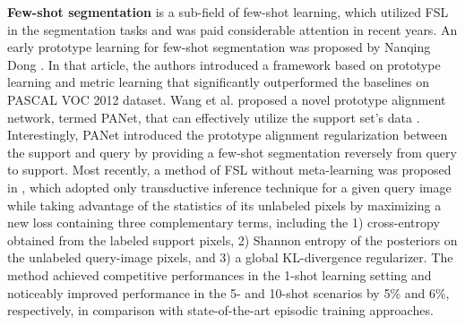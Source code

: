 \documentclass{ieeeaccess}
\begin{document}
{\bf Few-shot segmentation} \cite{Dong2018, Kaixin2019, Boudiaf2021} is a sub-field of few-shot learning, which utilized FSL in the segmentation tasks and was paid considerable attention in recent years. An early prototype learning for few-shot segmentation was proposed by Nanqing Dong \cite{Dong2018}. In that article, the authors introduced a framework based on prototype learning and metric learning that significantly outperformed the baselines on PASCAL VOC 2012 dataset.  Wang et al. proposed a novel prototype alignment network, termed PANet, that can effectively utilize the support set's data \cite{Kaixin2019}. Interestingly, PANet introduced the prototype alignment regularization between the support and query by providing a few-shot segmentation reversely from query to support. Most recently, a method of FSL without meta-learning was proposed in  \cite{Boudiaf2021}, which adopted only transductive inference technique for a given query image while taking advantage of the statistics of its unlabeled pixels by maximizing a new loss containing three complementary terms, including the 1) cross-entropy obtained from the labeled support pixels, 2) Shannon entropy of the posteriors on the unlabeled query-image pixels, and 3) a global KL-divergence regularizer. The method achieved competitive performances in the 1-shot learning setting  and noticeably improved performance in the 5- and 10-shot scenarios by 5\% and 6\%, respectively, in comparison with state-of-the-art episodic training approaches.


\end{document}
